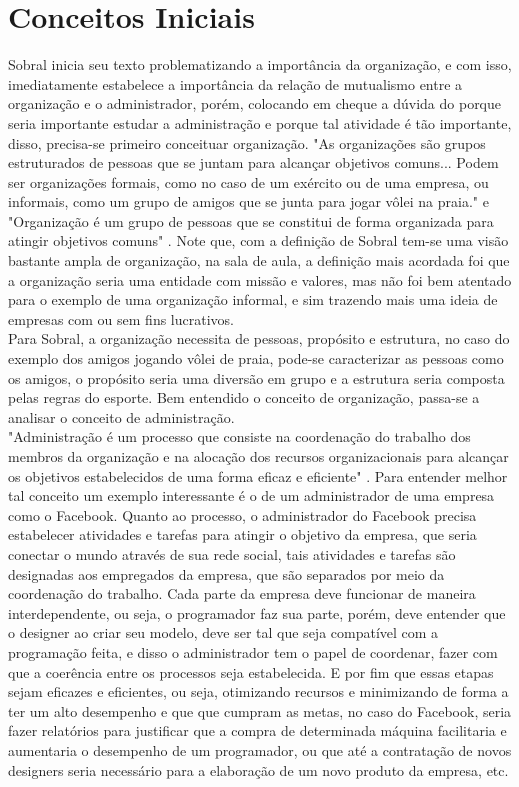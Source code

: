 \documentclass[14pt, oneside]{article}
\newcommand\tab[1][1cm]{\hspace*{#1}}
\theoremstyle{definition}
\begin{document}
            \section{Conceitos Iniciais}
                \tab Sobral inicia seu texto problematizando a importância da organização, e com isso, imediatamente estabelece a importância da relação de mutualismo entre a organização e o administrador, porém, colocando em cheque a dúvida do porque seria importante estudar a administração e porque tal atividade é tão importante, disso, precisa-se primeiro conceituar organização. "As organizações são grupos estruturados de pessoas que se juntam para alcançar objetivos comuns... Podem ser organizações formais, como no caso de um exército ou de uma empresa, ou informais, como um grupo de amigos que se junta para jogar vôlei na praia." \cite{sobral} e "Organização é um grupo de pessoas que se constitui de forma organizada para atingir objetivos comuns" \cite{lacombe}. Note que, com a definição de Sobral tem-se uma visão bastante ampla de organização, na sala de aula, a definição mais acordada foi que a organização seria uma entidade com missão e valores, mas não foi bem atentado para o exemplo de uma organização informal, e sim trazendo mais uma ideia de empresas com ou sem fins lucrativos. \\
                \tab Para Sobral, a organização necessita de pessoas, propósito e estrutura, no caso do exemplo dos amigos jogando vôlei de praia, pode-se caracterizar as pessoas como os amigos, o propósito seria uma diversão em grupo e a estrutura seria composta pelas regras do esporte. Bem entendido o conceito de organização, passa-se a analisar o conceito de administração. \\
                \tab "Administração é um processo que consiste na coordenação do trabalho dos membros da organização e na alocação dos recursos organizacionais para alcançar os objetivos estabelecidos de uma forma eficaz e eficiente" \cite{sobral}. Para entender melhor tal conceito um exemplo interessante é o de um administrador de uma empresa como o Facebook. Quanto ao processo, o administrador do Facebook precisa estabelecer atividades e tarefas para atingir o objetivo da empresa, que seria conectar o mundo através de sua rede social, tais atividades e tarefas são designadas aos empregados da empresa, que são separados por meio da coordenação do trabalho. Cada parte da empresa deve funcionar de maneira interdependente, ou seja, o programador faz sua parte, porém, deve entender que o designer ao criar seu modelo, deve ser tal que seja compatível com a programação feita, e disso o administrador tem o papel de coordenar, fazer com que a coerência entre os processos seja estabelecida. E por fim que essas etapas sejam eficazes e eficientes, ou seja, otimizando recursos e minimizando de forma a ter um alto desempenho e que que cumpram as metas, no caso do Facebook, seria fazer relatórios para justificar que a compra de determinada máquina facilitaria e aumentaria o desempenho de um programador, ou que até a contratação de novos designers seria necessário para a elaboração de um novo produto da empresa, etc. \\
                
\end{document}
